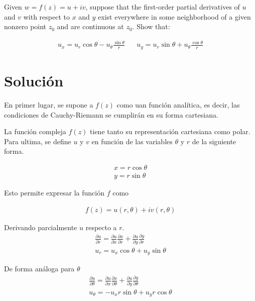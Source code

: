 \begin{problem}{5}
    Given $w = f(z) = u + iv$, suppose that the first-order partial derivatives of $u$ and $v$ with respect to $x$ and $y$ exist everywhere in some neighborhood of a given nonzero point $z_0$ and are continuous at $z_0$. Show that:

\begin{gather*}
    u_x = u_r\cos\theta - u_\theta\frac{\sin\theta}{r} \;\;\;\;\;\; u_y = u_r\sin\theta + u_\theta \frac{\cos\theta}{r}
\end{gather*}
\end{problem}

\section*{Solución}

En primer lugar, se supone a $f(z)$ como uan función analítica, es decir, las condiciones de Cauchy-Riemann se cumplirán en su forma cartesiana. 

\vspace{0.5cm}

La función compleja $f(z)$ tiene tanto su representación cartesiana como polar. Para ultima, se define $u$ y $v$ en función de las variables $\theta$ y $r$ de la siguiente forma. 

\begin{gather*}
    x = r\cos\theta\\
    y = r\sin\theta
\end{gather*}

Esto permite expresar la función $f$ como

\begin{gather*}
    f(z) = u(r,\theta) + iv(r,\theta)
\end{gather*}

Derivando parcialmente $u$ respecto a $r$.
\begin{gather*}
    \frac{\partial u}{\partial r} = \frac{\partial u}{\partial x}\frac{\partial x}{\partial r} + \frac{\partial u}{\partial y}\frac{\partial y}{\partial r}\\     
    u_r = u_x\cos\theta + u_y\sin\theta    
\end{gather*}

De forma análoga para $\theta$
\begin{gather*}
    \frac{\partial u}{\partial \theta} = \frac{\partial u}{\partial x}\frac{\partial x}{\partial \theta} + \frac{\partial u}{\partial y}\frac{\partial y}{\partial \theta}\\     
    u_\theta = - u_x r\sin\theta + u_yr\cos\theta    
\end{gather*}

